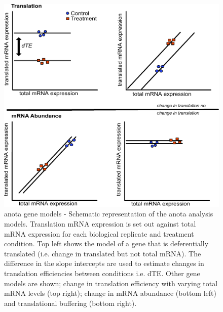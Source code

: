 \documentclass[12pt,openany]{book}
\begin{document}
\begin{figure}
  \includegraphics{./figures/geneModes_anota_Larsson.pdf}
  \caption{anota gene models - Schematic representation of the anota analysis models. Translation mRNA expression is set out against total mRNA expression for each biological replicate and treatment condition. Top left shows the model of a gene that is deferentially translated (i.e. change in translated but not total mRNA). The difference in the slope intercepts are used to estimate changes in translation efficiencies between conditions i.e. dTE. Other gene models are shown; change in translation efficiency with varying total mRNA levels (top right); change in mRNA abundance (bottom left) and translational buffering (bottom right).
  \label{fig:anota}}
\end{figure}
\end{document}
